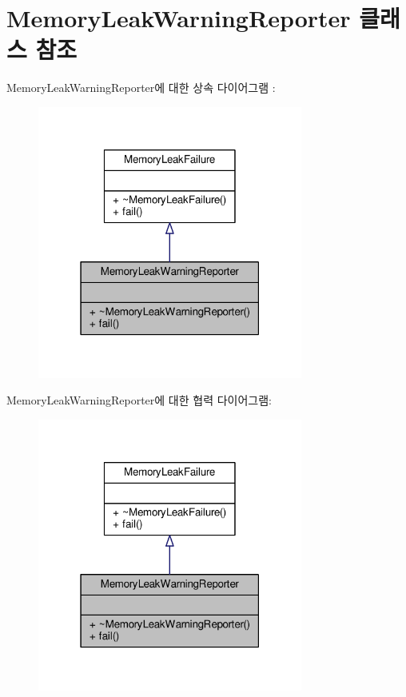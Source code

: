 \hypertarget{class_memory_leak_warning_reporter}{}\section{Memory\+Leak\+Warning\+Reporter 클래스 참조}
\label{class_memory_leak_warning_reporter}


Memory\+Leak\+Warning\+Reporter에 대한 상속 다이어그램 \+: 
\nopagebreak
\begin{figure}[H]
\begin{center}
\leavevmode
\includegraphics[width=247pt]{class_memory_leak_warning_reporter__inherit__graph}
\end{center}
\end{figure}


Memory\+Leak\+Warning\+Reporter에 대한 협력 다이어그램\+:
\nopagebreak
\begin{figure}[H]
\begin{center}
\leavevmode
\includegraphics[width=247pt]{class_memory_leak_warning_reporter__coll__graph}
\end{center}
\end{figure}

